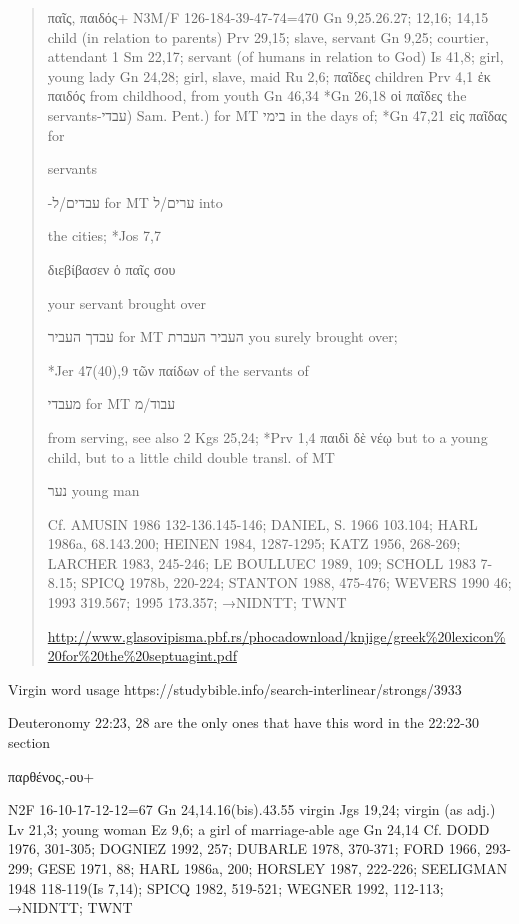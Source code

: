 \documentclass[11pt]{article}
\begin{document}
\begin{quoe}
\begin{quote}
\begin{greek} παῖς, παιδός+ N3M/F 126-184-39-47-74=470
Gn 9,25.26.27; 12,16; 14,15
child (in relation to parents) Prv 29,15; slave, servant Gn 9,25; courtier, attendant 1 Sm 22,17; servant
(of humans in relation to God) Is 41,8; girl, young lady Gn 24,28; girl, slave, maid Ru 2,6; παῖδες
children Prv 4,1
ἐκ παιδός from childhood, from youth Gn 46,34
*Gn 26,18 οἱ παῖδες the servants-עבדי) Sam. Pent.) for MT בימי in the days of; *Gn 47,21 εἰς παῖδας for \end{greek}
servants\begin{hebrew} -עבדים/ל for MT ערים/ל into \end{hebrew} the cities; *Jos 7,7 \begin{greek} διεβίβασεν ὁ παῖς σου \end{greek} your servant brought over
\begin{hebrew}
 עבדך
העביר for MT העביר העברת you surely brought over; 
 \end{hebrew}
\begin{greek}  *Jer 47(40),9 τῶν παίδων of the servants of \end{greek}
\begin{hebrew}
  מעבדי
for MT עבוד/מ 
\end{hebrew}
\begin{greek}
from serving, see also 2 Kgs 25,24; *Prv 1,4 παιδὶ δὲ νέῳ but to a young child, but to
a little child double transl. of MT
\end{greek}
\begin{hebrew}
 נער young man
\end{hebrew}
Cf. AMUSIN 1986 132-136.145-146; DANIEL, S. 1966 103.104; HARL 1986a, 68.143.200; HEINEN 1984,
1287-1295; KATZ 1956, 268-269; LARCHER 1983, 245-246; LE BOULLUEC 1989, 109; SCHOLL 1983 7-
8.15; SPICQ 1978b, 220-224; STANTON 1988, 475-476; WEVERS 1990 46; 1993 319.567; 1995 173.357;
→NIDNTT; TWNT 

\url{http://www.glasovipisma.pbf.rs/phocadownload/knjige/greek\%20lexicon%20for%20the%20septuagint.pdf}
\end{quote}


Virgin word usage https://studybible.info/search-interlinear/strongs/3933

 Deuteronomy 22:23, 28 are the only ones that have this word in the 22:22-30 section

\begin{greek}
παρθένος,-ου+ \end{greek} N2F 16-10-17-12-12=67
Gn 24,14.16(bis).43.55
virgin Jgs 19,24; virgin (as adj.) Lv 21,3; young woman Ez 9,6; a girl of marriage-able age Gn 24,14
Cf. DODD 1976, 301-305; DOGNIEZ 1992, 257; DUBARLE 1978, 370-371; FORD 1966, 293-299; GESE
1971, 88; HARL 1986a, 200; HORSLEY 1987, 222-226; SEELIGMAN 1948 118-119(Is 7,14); SPICQ 1982,
519-521; WEGNER 1992, 112-113; →NIDNTT; TWNT




\end{quoe}
\end{document}
